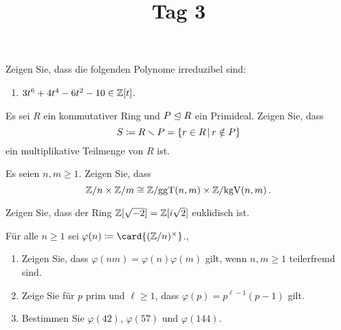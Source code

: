 \documentclass[a4paper, 10pt]{scrartcl}
\title{Tag 3}
\author{}
\date{}
\begin{document}
\begin{question}
  Zeigen Sie, dass die folgenden Polynome irreduzibel sind:
  \begin{enumerate}
    \item
      $3t^6 + 4t^4 - 6t^2 - 10 \in \mathbb{Z}[t]$.
  \end{enumerate}
\end{question}

\begin{question}
  Es sei $R$ ein kommutativer Ring und $P \mathrel{\trianglelefteq} R$ ein Primideal.
  Zeigen Sie, dass
  \[
              S
    \defined  R \smallsetminus P
    =         \{ r \in R \suchthat r \notin P \}
  \]
  ein multiplikative Teilmenge von $R$ ist.
\end{question}

\begin{question}
  Es seien $n, m \geq 1$.
  Zeigen Sie, dass
  \[
          \mathbb{Z}/n \times \mathbb{Z}/m
    \cong \mathbb{Z}/{\operatorname{ggT}(n,m)} \times \mathbb{Z}/{\operatorname{kgV}(n,m)} \,.
  \]
\end{question}

\begin{question}
  Zeigen Sie, dass der Ring $\mathbb{Z}[\sqrt{-2}] = \mathbb{Z}[i\sqrt{2}]$ euklidisch ist.
\end{question}

\begin{question}
  Für alle $n \geq 1$ sei $\varphi(n) \defined \card{\unitgroup{(\Integer/n)}}$.,
  \begin{enumerate}
    \item
      Zeigen Sie, dass $\varphi(nm) = \varphi(n)\varphi(m)$ gilt, wenn $n, m \geq 1$ teilerfremd sind.
    \item
      Zeige Sie für $p$ prim und $\ell \geq 1$, dass $\varphi(p) = p^{\ell-1} (p-1) $ gilt.
    \item
      Bestimmen Sie $\varphi(42)$, $\varphi(57)$ und $\varphi(144)$.
  \end{enumerate}
\end{question}
\end{document}
